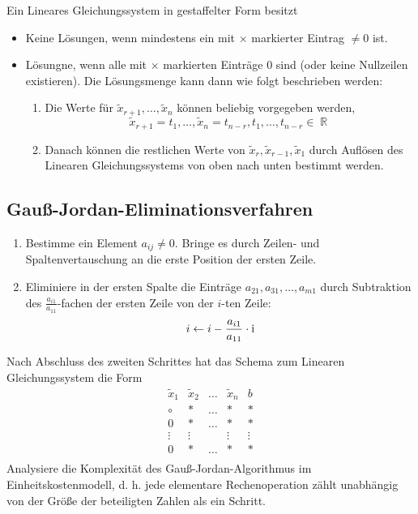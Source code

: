 \documentclass[a4paper,12pt]{article}
\newcommand{\RN}[1]{%
	\textup{\uppercase\expandafter{\romannumeral#1}}%
}
\DeclareMathOperator{\R}{\mathbb R}
\theoremstyle{definition}
\begin{document}
	Ein Lineares Gleichungssystem in gestaffelter Form besitzt
	\begin{itemize}
		\item Keine Lösungen, wenn mindestens ein mit $\times$ markierter Eintrag $\neq 0$ ist.
		\item Lösungne, wenn alle mit $\times$ markierten Einträge $0$ sind (oder keine Nullzeilen existieren). Die Lösungsmenge kann dann wie folgt beschrieben werden:
		\begin{enumerate}[label=(\roman*)]
			\item Die Werte für $\tilde{x}_{r + 1}, \ldots, \tilde{x}_n$ können beliebig vorgegeben werden, 
			\[
				\tilde{x}_{r + 1} = t_1, \ldots, \tilde{x}_{n} = t_{n - r}, t_1, \ldots, t_{n - r} \in \R
			\]
			\item Danach können die restlichen Werte von $\tilde{x}_r, \tilde{x}_{r - 1}, \tilde{x}_1$ durch Auflösen des Linearen Gleichungssystems von oben nach unten bestimmt werden.
		\end{enumerate}
	\end{itemize}
	\subsection{Gauß-Jordan-Eliminationsverfahren}
	\begin{enumerate}
		\item Bestimme ein Element $a_{ij} \neq 0$. Bringe es durch Zeilen- und Spaltenvertauschung an die erste Position der ersten Zeile.
		\item Eliminiere in der ersten Spalte die Einträge $a_{21}, a_{31}, \ldots, a_{m1}$ durch Subtraktion des $\frac{a_{i1}}{a_{11}}$-fachen der ersten Zeile von der $i$-ten Zeile:
		\[
			i \gets i - \frac{a_{i1}}{a_{11}}\cdot \RN{1}
		\]
	\end{enumerate}
	Nach Abschluss des zweiten Schrittes hat das Schema zum Linearen Gleichungssystem die Form
	\[
		\begin{array}{cccc|c}
			\tilde{x}_1 & \tilde{x}_2 & \ldots & \tilde{x}_n & b\\\hline
			\circ & \ast & \ldots & \ast & \ast\\
			0 & \ast & \ldots& \ast & \ast\\
			\vdots & \vdots & & \vdots & \vdots\\
			0 & \ast & \ldots& \ast & \ast\\
		\end{array}
	\]
	Analysiere die Komplexität des Gauß-Jordan-Algorithmus im Einheitskostenmodell, d. h. jede elementare Rechenoperation zählt unabhängig von der Größe der beteiligten Zahlen als ein Schritt.
	
\end{document}

